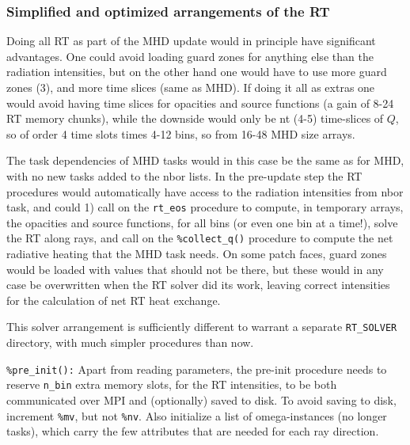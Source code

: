 \documentclass[paper=a4,fontsize=11pt]{scrartcl}
\numberwithin{equation}{section}		%
\numberwithin{figure}{section}			%
\numberwithin{table}{section}				%
\begin{document}
\subsubsection{Simplified and optimized arrangements of the RT}

Doing all RT as part of the MHD update would in principle have significant advantages.  One could avoid loading guard zones for anything else than the radiation intensities, but on the other hand one would have to use more guard zones (3), and more time slices (same as MHD).  If doing it all as extras one would avoid having time slices for opacities and source functions (a gain of 8-24 RT memory chunks), while the downside would only be nt (4-5) time-slices of $Q$, so of order 4 time slots times 4-12 bins, so from 16-48 MHD size arrays.

The task dependencies of MHD tasks would in this case be the same as for MHD, with no new tasks added to the nbor lists.  In the pre-update step the RT procedures would automatically have access to the radiation intensities from nbor task, and could 1) call on the \verb|rt_eos| procedure to compute, in temporary arrays, the opacities and source functions, for all bins (or even one bin at a time!), solve the RT along rays, and call on the \verb|%collect_q()| procedure to compute the net radiative heating that the MHD task needs.  On some patch faces, guard zones would be loaded with values that should not be there, but these would in any case be overwritten when the RT solver did its work, leaving correct intensities for the calculation of net RT heat exchange.

This solver arrangement is sufficiently different to warrant a separate \verb|RT_SOLVER| directory, with much simpler procedures than now.

\verb|%pre_init():| Apart from reading parameters, the pre-init procedure needs to reserve \verb|n_bin| extra memory slots, for the RT intensities, to be both communicated over MPI and (optionally) saved to disk.  To avoid saving to disk, increment \verb|%mv|, but not \verb|%nv|.  Also initialize a list of omega-instances (no longer tasks), which carry the few attributes that are needed for each ray direction.
\end{document}
